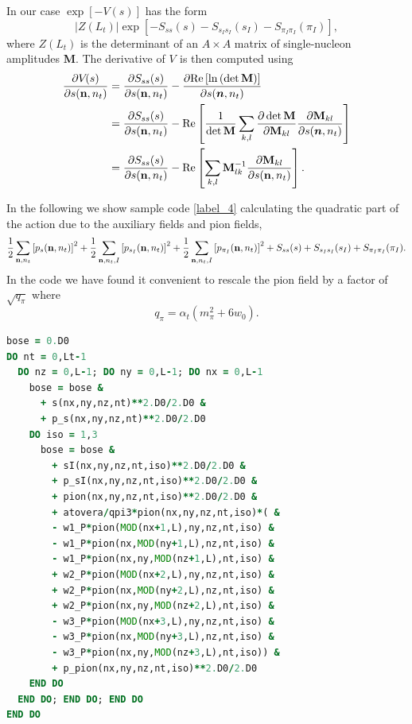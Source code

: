 In our case $\exp[-V(s)]$ has the form 
\begin{equation}
|Z(L_t)|\exp{\left[-S_{ss}(s)
-S_{s_Is_I}(s_I)
-S_{\pi_I\pi_I}(\pi_I)\right]},
\end{equation} 
where $Z(L_t)$ is the determinant
of an $A\times A$ matrix of single-nucleon amplitudes {\bf M}.  The derivative of
$V_{}$ is then computed using%
\begin{align}
\frac{\partial V_{}(s)}{\partial s({\bf n},n_t)}  &  =\frac{\partial
S_{ss}(s)}{\partial s({\bf n},n_t)}- \frac{\partial {\rm Re} \left[
\ln \left( \det\mathbf{M} \right) \right]}{\partial s(\vec
{n},n_t)} \nonumber\\
  &  =\frac{\partial
S_{ss}(s)}{\partial s({\bf n},n_t)}- {\rm Re} \left[ \frac{1}{\det\mathbf{M}}\sum
_{k,l}\frac{\partial\det\mathbf{M}}{\partial \mathbf{M}
_{kl}}\frac{\partial  \mathbf{M}_{kl}}{\partial s(\vec
{n},n_t)} \right] \nonumber\\
&  =\frac{\partial S_{ss}(s)}{\partial s({\bf n},n_t)}- {\rm Re} \left[
\sum_{k,l}
\mathbf{M}^{-1}  _{lk}\frac{\partial  \mathbf{M}
_{kl}}{\partial s({\bf n},n_t)} \right].
\end{align}

In the following we show sample code \ref{label_4} calculating the
quadratic part of the action due to the auxiliary fields and pion fields,
\begin{equation}
\frac{1}{2}\sum_{{\bf n},n_t}\left[p_s({{\bf n},n_t})\right]^{2}+\frac{1}{2}\sum_{{\bf n},n_t,I}\left[  p_{s_I}({{\bf n},n_t})\right]^{2}+\frac{1}{2}\sum_{{\bf n},n_t,I}\left[p_{\pi_I}({{\bf n},n_t})\right]^{2}+S_{ss}(s) + S_{s_Is_I}(s_I) + S_{\pi_I\pi_I}(\pi_I).
\end{equation}
In the code we have found it convenient to rescale the pion field by a factor of $\sqrt{q_{\pi}}$ where 
\begin{equation}
q_{\pi}=\alpha_{t} \left( m_{\pi}^2 + 6w_0 \right).
\end{equation}

\begin{lstlisting}[language=Fortran,caption=Sample code calculating the
quadratic part of the action due to the auxiliary fields and pion fields.,label={label_4}]
bose = 0.D0
DO nt = 0,Lt-1
  DO nz = 0,L-1; DO ny = 0,L-1; DO nx = 0,L-1
    bose = bose &
      + s(nx,ny,nz,nt)**2.D0/2.D0 &
      + p_s(nx,ny,nz,nt)**2.D0/2.D0
    DO iso = 1,3
      bose = bose &
        + sI(nx,ny,nz,nt,iso)**2.D0/2.D0 &
        + p_sI(nx,ny,nz,nt,iso)**2.D0/2.D0 &
        + pion(nx,ny,nz,nt,iso)**2.D0/2.D0 &
        + atovera/qpi3*pion(nx,ny,nz,nt,iso)*( &
        - w1_P*pion(MOD(nx+1,L),ny,nz,nt,iso) &
        - w1_P*pion(nx,MOD(ny+1,L),nz,nt,iso) &
        - w1_P*pion(nx,ny,MOD(nz+1,L),nt,iso) &
        + w2_P*pion(MOD(nx+2,L),ny,nz,nt,iso) &
        + w2_P*pion(nx,MOD(ny+2,L),nz,nt,iso) &
        + w2_P*pion(nx,ny,MOD(nz+2,L),nt,iso) &
        - w3_P*pion(MOD(nx+3,L),ny,nz,nt,iso) &
        - w3_P*pion(nx,MOD(ny+3,L),nz,nt,iso) &
        - w3_P*pion(nx,ny,MOD(nz+3,L),nt,iso)) &
        + p_pion(nx,ny,nz,nt,iso)**2.D0/2.D0
    END DO
  END DO; END DO; END DO
END DO

\end{lstlisting}     

